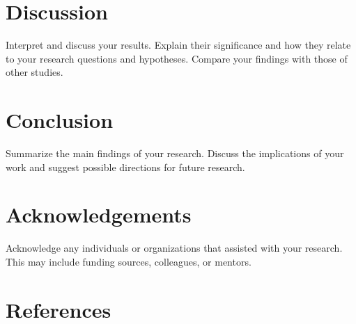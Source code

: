 \documentclass[a4paper, 15pt,usenatbib]{article}
\begin{document}
\section{Discussion}
Interpret and discuss your results. Explain their significance and how they relate to your research questions and hypotheses. Compare your findings with those of other studies.

\section{Conclusion}
Summarize the main findings of your research. Discuss the implications of your work and suggest possible directions for future research.

\section{Acknowledgements}
Acknowledge any individuals or organizations that assisted with your research. This may include funding sources, colleagues, or mentors.

\section{References}
%
%






\end{document}
